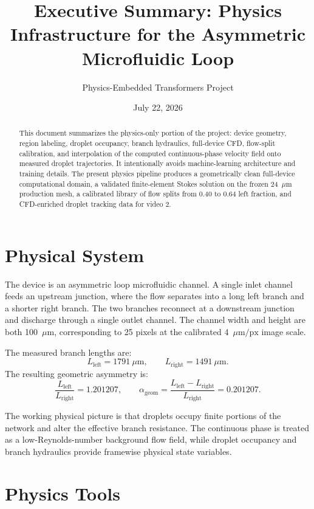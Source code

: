 \documentclass[11pt]{article}
\title{Executive Summary: Physics Infrastructure for the Asymmetric Microfluidic Loop}
\author{Physics-Embedded Transformers Project}
\date{July 22, 2026}
\begin{document}
\maketitle

\begin{abstract}
This document summarizes the physics-only portion of the project: device
geometry, region labeling, droplet occupancy, branch hydraulics, full-device
CFD, flow-split calibration, and interpolation of the computed continuous-phase
velocity field onto measured droplet trajectories. It intentionally avoids
machine-learning architecture and training details. The present physics
pipeline produces a geometrically clean full-device computational domain, a
validated finite-element Stokes solution on the frozen 24~\(\mu\mathrm{m}\)
production mesh, a calibrated library of flow splits from 0.40 to 0.64 left
fraction, and CFD-enriched droplet tracking data for video 2.
\end{abstract}

\section{Physical System}

The device is an asymmetric loop microfluidic channel. A single inlet channel
feeds an upstream junction, where the flow separates into a long left branch
and a shorter right branch. The two branches reconnect at a downstream junction
and discharge through a single outlet channel. The channel width and height are
both 100~\(\mu\mathrm{m}\), corresponding to 25 pixels at the calibrated
4~\(\mu\mathrm{m/px}\) image scale.

The measured branch lengths are:
\[
L_{\mathrm{left}} = 1791~\mu\mathrm{m}, \qquad
L_{\mathrm{right}} = 1491~\mu\mathrm{m}.
\]
The resulting geometric asymmetry is:
\[
\frac{L_{\mathrm{left}}}{L_{\mathrm{right}}} = 1.201207,
\qquad
\alpha_{\mathrm{geom}}
= \frac{L_{\mathrm{left}} - L_{\mathrm{right}}}{L_{\mathrm{right}}}
= 0.201207.
\]

The working physical picture is that droplets occupy finite portions of the
network and alter the effective branch resistance. The continuous phase is
treated as a low-Reynolds-number background flow field, while droplet occupancy
and branch hydraulics provide framewise physical state variables.

\section{Physics Tools}
\end{document}
